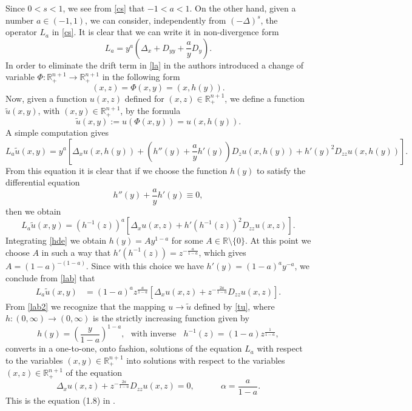 \documentclass[11pt]{amsart}
\theoremstyle{plain}
\numberwithin{equation}{section}
\begin{document}
Since $0<s<1$, we see from \eqref{cs} that $-1<a<1$. On the other hand, given a number $a\in (-1,1)$, we can consider, independently from $(-\Delta)^s$, the operator $L_a$ in \eqref{cs}. It is clear that we can write it in non-divergence form
\begin{equation}\label{la}
L_a = y^a \left(\Delta_x + D_{yy} + \frac ay D_y\right).
\end{equation}
In order to eliminate the drift term in \eqref{la} in \cite{CS} the authors introduced a change of variable $\Phi: {\mathbb R}^{n+1}_+ \to {\mathbb R}^{n+1}_+$ in the following form
\begin{equation}\label{phi}
(x,z) = \Phi(x,y) = (x,h(y)).
\end{equation}
Now, given a function $u(x,z)$ defined for $(x,z)\in {{\mathbb R}^{n+1}_+}$, we define a function $\tilde u(x,y)$, with $(x,y) \in {{\mathbb R}^{n+1}_+}$, by the formula
\begin{equation}\label{tu}
\tilde u(x,y) := u(\Phi(x,y)) = u(x,h(y)).
\end{equation}
A simple computation gives
\[
L_a \tilde u(x,y) = y^a\left[\Delta_x u(x,h(y)) + \left(h''(y) + \frac ay h'(y)\right) D_z u(x,h(y)) + h'(y)^2 D_{zz} u(x,h(y))\right].
\]
From this equation it is clear that if we choose the function $h(y)$ to satisfy the differential equation
\begin{equation}\label{hde}
h''(y) + \frac ay h'(y)  \equiv 0,
\end{equation}
then we obtain
\begin{equation}\label{lab}
L_a \tilde u(x,y) =  (h^{-1}(z))^a\left[\Delta_x u(x,z) + h'(h^{-1}(z))^2 D_{zz} u(x,z)\right].
\end{equation}
Integrating \eqref{hde} we obtain $h(y) = A y^{1-a}$ for some $A\in {\mathbb R}\setminus \{0\}$. At this point we choose $A$ in such a way that $h'(h^{-1}(z)) = z^{-\frac{a}{1-a}}$, which gives $A = (1-a)^{-(1-a)}$. Since with this choice we have $h'(y) = (1-a)^a y^{-a}$, we conclude from \eqref{lab} that
\begin{align}\label{lab2}
L_a \tilde u(x,y) & =  (1-a)^a z^{\frac{a}{1-a}} \left[\Delta_x u(x,z) + z^{-\frac{2a}{1-a}} D_{zz} u(x,z)\right].
\end{align}
From \eqref{lab2} we recognize that the mapping $u\to \tilde u$ defined by \eqref{tu}, where $h:(0,\infty)\to (0,\infty)$ is
the strictly increasing function given by
\begin{equation}\label{h}
h(y) = \left(\frac{y}{1-a}\right)^{1-a},\ \ \ \text{with inverse}\ \ \ \ h^{-1}(z) = (1-a) z^{\frac{1}{1-a}},
\end{equation}
converts in a one-to-one, onto fashion, solutions of the equation $L_a$ with respect to the variables $(x,y)\in {{\mathbb R}^{n+1}_+}$ into solutions with respect to the variables $(x,z)\in {{\mathbb R}^{n+1}_+}$ of the equation
\begin{equation}\label{bg0}
\Delta_x u(x,z) + z^{-\frac{2a}{1-a}} D_{zz} u(x,z) = 0,\ \ \ \ \ \ \ \ \ \ \ \  \ \  \alpha = \frac{a}{1-a}.
\end{equation}
This is the equation (1.8) in \cite{CS}.
\end{document}
